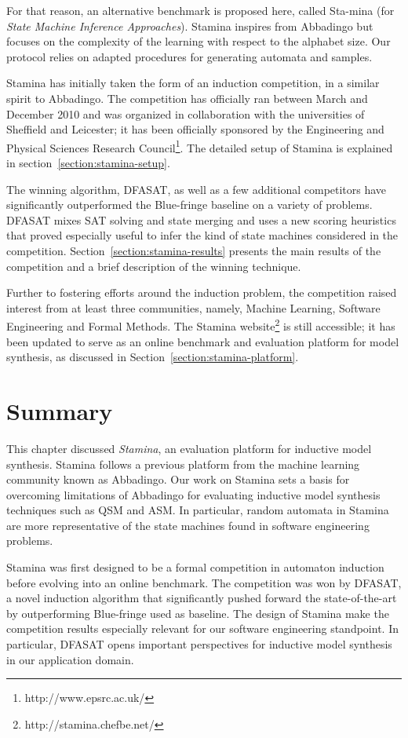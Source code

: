 For that reason, an alternative benchmark is proposed here, called Sta-mina (for \emph{State Machine Inference Approaches}). Stamina inspires from Abbadingo but focuses on the complexity of the learning with respect to the alphabet size. Our protocol relies on adapted procedures for generating automata and samples. 

Stamina has initially taken the form of an induction competition, in a similar spirit to Abbadingo. The competition has officially ran between March and December 2010 and was organized in collaboration with the universities of Sheffield and Leicester; it has been officially sponsored by the Engineering and Physical Sciences Research Council\footnote{http://www.epsrc.ac.uk/}. The detailed setup of Stamina is explained in section~\ref{section:stamina-setup}. 

The winning algorithm, DFASAT, as well as a few additional competitors have significantly outperformed the Blue-fringe baseline on a variety of problems. DFASAT mixes SAT solving and state merging and uses a new scoring heuristics that proved especially useful to infer the kind of state machines considered in the competition. Section~\ref{section:stamina-results} presents the main results of the competition and a brief description of the winning technique. 

Further to fostering efforts around the induction problem, the competition raised interest from at least three communities, namely, Machine Learning, Software Engineering and Formal Methods. The Stamina website\footnote{http://stamina.chefbe.net/} is still accessible; it has been updated to serve as an online benchmark and evaluation platform for model synthesis, as discussed in Section~\ref{section:stamina-platform}.






\section*{Summary}

This chapter discussed \emph{Stamina}, an evaluation platform for inductive model synthesis. Stamina follows a previous platform from the machine learning community known as Abbadingo. Our work on Stamina sets a basis for overcoming limitations of Abbadingo for evaluating inductive model synthesis techniques such as QSM and ASM. In particular, random automata in Stamina are more representative of the state machines found in software engineering problems.

Stamina was first designed to be a formal competition in automaton induction before evolving into an online benchmark. The competition was won by DFASAT, a novel induction algorithm that significantly pushed forward the state-of-the-art by outperforming Blue-fringe used as baseline. The design of Stamina make the competition results especially relevant for our software engineering standpoint. In particular, DFASAT opens important perspectives for inductive model synthesis in our application domain.
